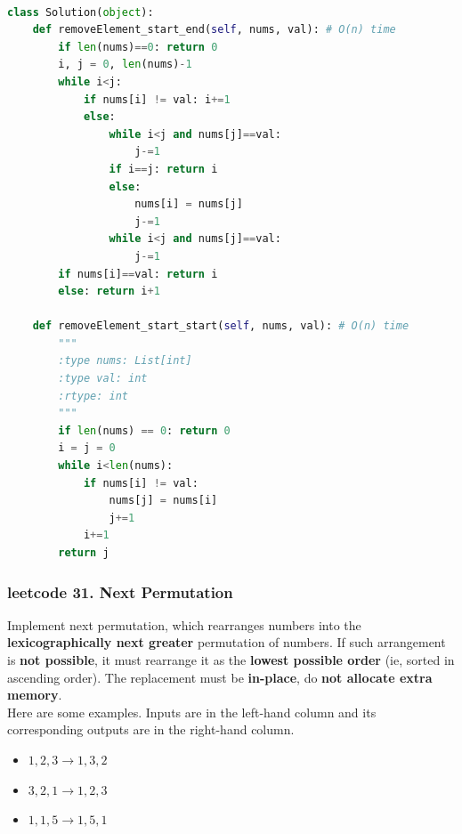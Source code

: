 \documentclass[a4paper,10pt]{article}
\begin{document}
\begin{lstlisting}[language=Python, caption=Problem27. Remove Element]

class Solution(object):
    def removeElement_start_end(self, nums, val): # O(n) time
        if len(nums)==0: return 0
        i, j = 0, len(nums)-1
        while i<j:
            if nums[i] != val: i+=1
            else:
                while i<j and nums[j]==val:
                    j-=1
                if i==j: return i
                else: 
                    nums[i] = nums[j]
                    j-=1
                while i<j and nums[j]==val:
                    j-=1
        if nums[i]==val: return i
        else: return i+1
        
    def removeElement_start_start(self, nums, val): # O(n) time
        """
        :type nums: List[int]
        :type val: int
        :rtype: int
        """
        if len(nums) == 0: return 0
        i = j = 0
        while i<len(nums):
            if nums[i] != val:
                nums[j] = nums[i]
                j+=1
            i+=1
        return j
\end{lstlisting}





\subsubsection{leetcode 31. Next Permutation}
Implement next permutation, which rearranges numbers into the \textbf{lexicographically next greater} permutation of numbers. If such arrangement is \textbf{not possible}, it must rearrange it as the \textbf{lowest possible order} (ie, sorted in ascending order). The replacement must be \textbf{in-place}, do \textbf{not allocate extra memory}.\\

\noindent Here are some examples. Inputs are in the left-hand column and its corresponding outputs are in the right-hand column.
\begin{itemize}
    \item $1,2,3 \to 1,3,2$
    \item $3,2,1 \to 1,2,3$
    \item $1,1,5 \to 1,5,1$
\end{itemize}
\end{document}
